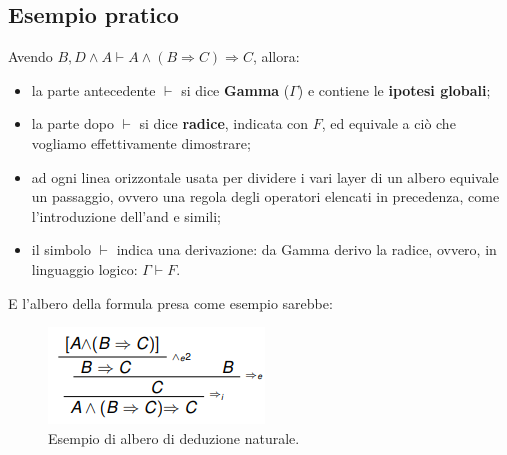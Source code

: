 \documentclass[12pt]{article}
\begin{document}
\subsection{Esempio pratico}
Avendo $B,D \wedge A \vdash A \wedge (B \Rightarrow C) \Rightarrow C$, allora:
\begin{itemize}
    \item la parte antecedente $\vdash$ si dice \textbf{Gamma} ($\Gamma$) e contiene le \textbf{ipotesi globali};
    \item la parte dopo $\vdash$ si dice \textbf{radice}, indicata con $F$, ed equivale a ciò che vogliamo effettivamente dimostrare;
    \item ad ogni linea orizzontale usata per dividere i vari layer di un albero equivale un passaggio, ovvero una regola degli operatori elencati in precedenza, come l'introduzione dell'and e simili;
    \item il simbolo $\vdash$ indica una derivazione: da Gamma derivo la radice, ovvero, in linguaggio logico: $\Gamma \vdash F$.
\end{itemize}
E l'albero della formula presa come esempio sarebbe:
\begin{figure}[!htb]
    \centering
    \includegraphics[width=.9\linewidth,height=.40\textheight,keepaspectratio]{logica_proposizionale/introduzione/albero_deduzione.png} %
    \begin{center}
        \caption{\label{fig:}Esempio di albero di deduzione naturale.}
    \end{center}
\end{figure}
\end{document}
